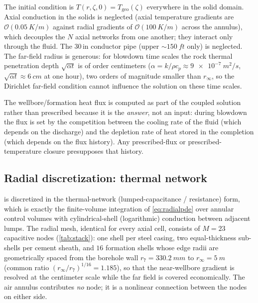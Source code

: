 \documentclass[11pt]{article}
\begin{document}
The initial condition is $T(r, \zeta, 0) = T_{\mathrm{geo}}(\zeta)$
everywhere in the solid domain. Axial conduction in the solids is
neglected (axial temperature gradients are
$\mathcal{O}(\SI{0.05}{K/m})$ against radial gradients of
$\mathcal{O}(\SI{100}{K/m})$ across the annulus), which decouples the
$N$ axial networks from one another; they interact only through the
fluid. The 30\,in conductor pipe (upper ${\sim}\SI{150}{ft}$ only) is
neglected. The far-field radius is generous: for blowdown time scales
the rock thermal penetration depth $\sqrt{\alpha t}$ is of order
centimeters ($\alpha = k/\rho c_p \approx \SI{9e-7}{m^2/s}$,
$\sqrt{\alpha t} \approx \SI{6}{cm}$ at one hour), two orders of
magnitude smaller than $r_\infty$, so the Dirichlet far-field
condition cannot influence the solution on these time scales.

The wellbore/formation heat flux is computed as part of the coupled
solution rather than prescribed because it is the \emph{answer}, not
an input: during blowdown the flux is set by the competition between
the cooling rate of the fluid (which depends on the discharge) and the
depletion rate of heat stored in the completion (which depends on the
flux history). Any prescribed-flux or prescribed-temperature closure
presupposes that history.

\subsection{Radial discretization: thermal network}
\label{sec:thermal-network}

 is discretized in the thermal-network
(lumped-capacitance / resistance) form, which is exactly the
finite-volume integration of \cref{eq:radialpde} over annular control
volumes with cylindrical-shell (logarithmic) conduction between
adjacent lumps. The radial mesh, identical for every axial cell,
consists of $M = 23$ capacitive nodes (\cref{tab:stack}): one shell
per steel casing, two equal-thickness sub-shells per cement sheath,
and $16$ formation shells whose edge radii are geometrically spaced
from the borehole wall $r_7 = \SI{330.2}{mm}$ to
$r_\infty = \SI{5}{m}$ (common ratio
$(r_\infty/r_7)^{1/16} = 1.185$), so that the near-wellbore gradient
is resolved at the centimeter scale while the far field is covered
economically. The air annulus contributes \emph{no} node; it is a
nonlinear connection between the nodes on either side.
\end{document}
